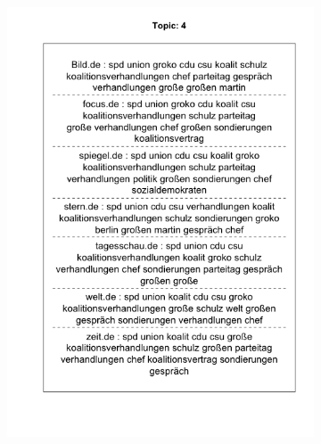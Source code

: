 \documentclass[12pt,a4paper,notitlepage]{article}
\begin{document}
\begin{figure}[H]
	\begin{center}
		\begin{subfigure}[normla]{0.49\textwidth}
			\includegraphics[width=\textwidth]{figs/plotquote4.png}
		\end{subfigure}
		\begin{subfigure}[normla]{0.49\textwidth}

\end{subfigure}
\end{center}
\end{figure}
\end{document}
